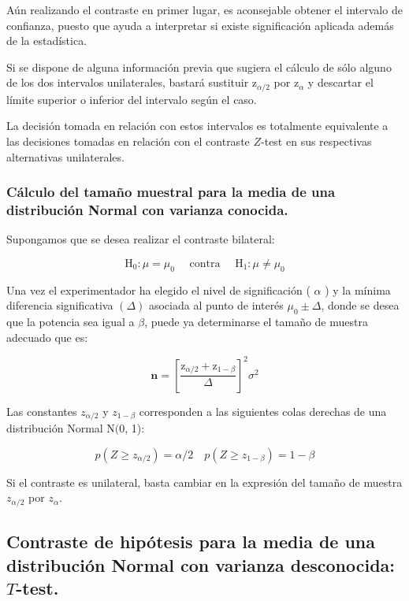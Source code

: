 \documentclass[
]{article}
\begin{document}
Aún realizando el contraste en primer lugar, es aconsejable obtener el intervalo de confianza, puesto que ayuda a interpretar si existe significación aplicada además de la estadística.

Si se dispone de alguna información previa que sugiera el cálculo de sólo alguno de los dos intervalos unilaterales, bastará sustituir \(\mathrm{z}_{\alpha / 2}\) por \(\mathrm{z}_{\alpha}\) y descartar el límite superior o inferior del intervalo según el caso.

La decisión tomada en relación con estos intervalos es totalmente equivalente a las decisiones tomadas en relación con el contraste \(Z\)-test en sus respectivas alternativas unilaterales.

\subsubsection{Cálculo del tamaño muestral para la media de una distribución Normal con varianza conocida.}\label{cuxe1lculo-del-tamauxf1o-muestral-para-la-media-de-una-distribuciuxf3n-normal-con-varianza-conocida.}

Supongamos que se desea realizar el contraste bilateral:

\[
\mathrm{H}_{0}: \mu=\mu_{0} \quad \text { contra } \quad \mathrm{H}_{1}: \mu \neq \mu_{0}
\]

Una vez el experimentador ha elegido el nivel de significación ( \(\alpha\) ) y la mínima diferencia significativa \((\Delta)\) asociada al punto de interés \(\mu_{0} \pm \Delta\), donde se desea que la potencia sea igual a \(\beta\), puede ya determinarse el tamaño de muestra adecuado que es:

\[
\mathbf{n}=\left[\frac{\mathrm{z}_{\alpha / 2}+\mathrm{z}_{1-\beta}}{\Delta}\right]^{2} \sigma^{2}
\]

Las constantes \(z_{\alpha / 2}\) y \(z_{1-\beta}\) corresponden a las siguientes colas derechas de una distribución Normal \(\mathrm{N}(0\), 1):

\[
p\left(Z \geq z_{\alpha / 2}\right)=\alpha / 2 \quad p\left(Z \geq z_{1-\beta}\right)=1-\beta
\]

Si el contraste es unilateral, basta cambiar en la expresión del tamaño de muestra \(z_{\alpha / 2}\) por \(z_{\alpha}\).

\subsection{\texorpdfstring{Contraste de hipótesis para la media de una distribución Normal con varianza desconocida: \(T\)-test.}{Contraste de hipótesis para la media de una distribución Normal con varianza desconocida: T-test.}}\label{contraste-de-hipuxf3tesis-para-la-media-de-una-distribuciuxf3n-normal-con-varianza-desconocida-t-test.}
\end{document}
